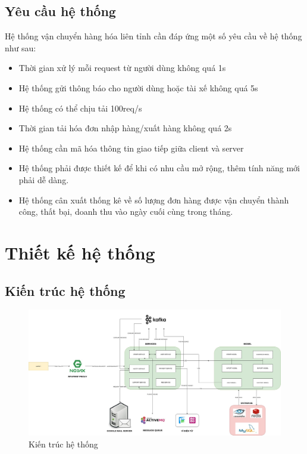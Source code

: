     \subsection{Yêu cầu hệ thống}
    Hệ thống vận chuyển hàng hóa liên tỉnh cần đáp ứng một số yêu cầu về hệ thống như sau:
        \begin{itemize}
            \item Thời gian xử lý mỗi request từ người dùng không quá 1s
            \item Hệ thống gửi thông báo cho người dùng hoặc tài xế  không quá 5s
            \item Hệ thống có thể chịu tải 100req/s
            \item Thời gian tải hóa đơn nhập hàng/xuất hàng không quá 2s
            \item Hệ thống cần mã hóa thông tin giao tiếp giữa client và server
            \item Hệ thống phải được thiết kế để khi có nhu cầu mở rộng, thêm tính năng mới phải dễ dàng.
            \item Hệ thống cân xuất thống kê về số lượng đơn hàng được vận chuyển thành công, thất bại, doanh thu vào ngày cuối cùng trong tháng.
        \end{itemize}
    
    \newpage

\section{Thiết kế hệ thống}

\subsection{Kiến trúc hệ thống}
	
		\begin{figure}[!ht]
			\includegraphics[width=1\textwidth]{Images/SystemArchitecture.jpg}
			\centering
			\linebreak
			\caption{Kiến trúc hệ thống}
		\end{figure}
	


